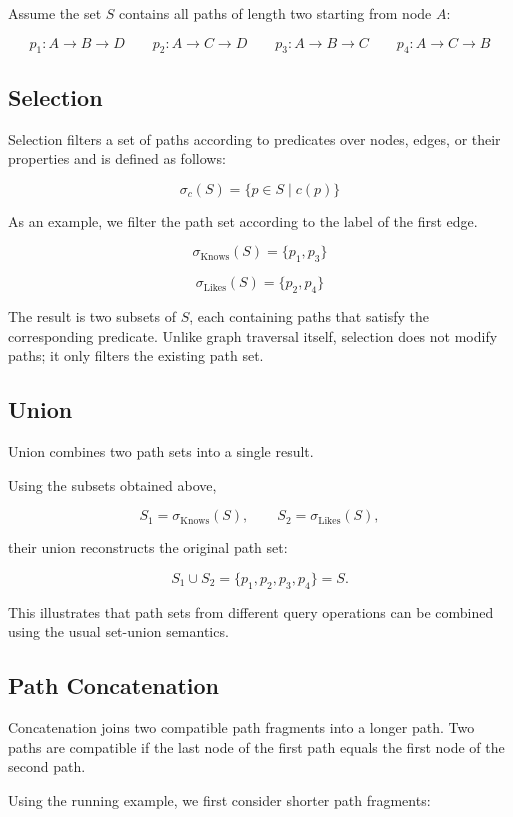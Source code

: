 Assume the set $S$ contains all paths of length two starting from node $A$:

\[
p_1: A \rightarrow B \rightarrow D
\qquad
p_2: A \rightarrow C \rightarrow D
\qquad
p_3: A \rightarrow B \rightarrow C
\qquad
p_4: A \rightarrow C \rightarrow B
\]

\subsection{Selection}
Selection filters a set of paths according to predicates over nodes, edges, or their properties and is defined as follows:

\[
\sigma_c(S) = \{ p \in S \mid c(p) \}
\]

As an example, we filter the path set according to the label of the first edge.

\[
\sigma_{\text{Knows}}(S)=\{p_1,p_3\}
\]

\[
\sigma_{\text{Likes}}(S)=\{p_2,p_4\}
\]

The result is two subsets of $S$, each containing paths that satisfy the corresponding predicate. Unlike graph traversal itself, selection does not modify paths; it only filters the existing path set.

\subsection{Union}

Union combines two path sets into a single result.

Using the subsets obtained above,

\[
S_1=\sigma_{\text{Knows}}(S),
\qquad
S_2=\sigma_{\text{Likes}}(S),
\]

their union reconstructs the original path set:

\[
S_1\cup S_2
=
\{p_1,p_2,p_3,p_4\}
=
S.
\]

This illustrates that path sets from different query operations can be combined using the usual set-union semantics.

\subsection{Path Concatenation}
Concatenation joins two compatible path fragments into a longer path. Two paths are compatible if the last node of the first path equals the first node of the second path.

Using the running example, we first consider shorter path fragments:

